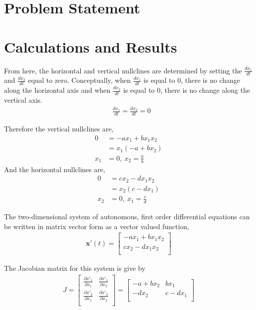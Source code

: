 \documentclass[12pt]{article}   %
\theoremstyle{definition}
\numberwithin{equation}{section}
\begin{document}
\section{Problem Statement} \label{APPM2360proj01sec01}




\setcounter{page}{5}
\section{Calculations and Results} \label{APPM2360proj01sec01} 

From here, the horizontal and vertical nullclines are determined by setting the $\frac{dx_1}{dt}$ and $\frac{dx_2}{dt}$ equal to zero. Conceptually, when $\frac{dx_1}{dt}$ is equal to 0, there is no change along the horizontal axis and when $\frac{dx_2}{dt}$ is equal to 0, there is no change along the vertical axis. 
\begin{align*}
& \frac{dx_1}{dt} = \frac{dx_2}{dt} = 0
\end{align*}

Therefore the vertical nullclines are,
\begin{align*}
%
0 & =  -ax_1 + bx_1x_2 \\
%  
 & = x_1(-a + bx_2) \\
%
x_1 &= 0, \ x_2 = \frac{a}{b}  
%
\end{align*}
And the horizontal nullclines are, 
\begin{align*}
%
0 & = cx_2 - dx_1x_2 \\  
%
& =  x_2(c - dx_1) \\
%
x_2 &= 0, \ x_1 = \frac{c}{d} 
\end{align*}



The two-dimensional system of autonomous, first order differential equations can be written in matrix vector form as a vector valued function, 
\begin{align*} 
\textbf{x}'(t) 
= 
\begin{bmatrix}
     -ax_1 + bx_1x_2\\
     cx_2 - dx_1x_2\\
\end{bmatrix}
\end{align*}

The Jacobian matrix for this system is give by
\begin{align*} 
J 
=
\begin{bmatrix}
     \frac{\partial{x'_1}}{\partial{x_1}} & \frac{\partial{x'_1}}{\partial{x_2}}\\
     \frac{\partial{x'_2}}{\partial{x_1}} &  \frac{\partial{x'_2}}{\partial{x_2}}\\
\end{bmatrix}
=
\begin{bmatrix}
     -a+bx_2 & bx_1\\
     -dx_2 & c-dx_1\\
\end{bmatrix}
\end{align*}
\end{document}
